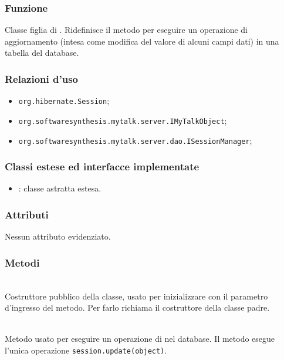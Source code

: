 
\subsubsection*{Funzione}
Classe figlia di . Ridefinisce il metodo  per eseguire un operazione di aggiornamento (intesa come modifica del valore di alcuni campi dati) in una tabella del database.

\subsubsection*{Relazioni d'uso}

\begin{itemize}
		\item \texttt{org.hibernate.Session};
		\item \texttt{org.softwaresynthesis.mytalk.server.IMyTalkObject};
		\item \texttt{org.softwaresynthesis.mytalk.server.dao.ISessionManager};
\end{itemize}

\subsubsection*{Classi estese ed interfacce implementate}

\begin{itemize}
	\item {}: classe astratta estesa.
\end{itemize}

\subsubsection*{Attributi}

Nessun attributo evidenziato.

\subsubsection*{Metodi}

\begin{description}
	\item{}\\
	Costruttore pubblico della classe, usato per inizializzare  con il parametro d'ingresso del metodo. Per farlo richiama il costruttore della classe padre.

	\item{}\\
	Metodo usato per eseguire un operazione di  nel database. Il metodo esegue l'unica operazione \verb|session.update(object)|.

\end{description}

